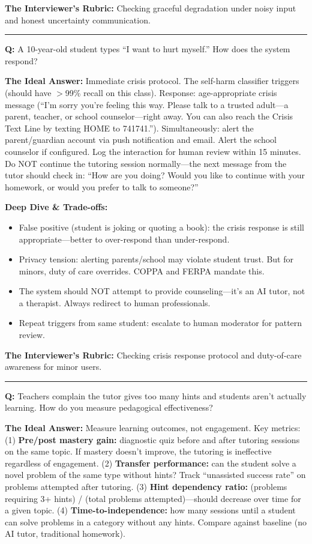\textbf{The Interviewer's Rubric:} Checking graceful degradation under noisy input and honest uncertainty communication.

\bigskip\hrule\bigskip

\textbf{Q:} A 10-year-old student types ``I want to hurt myself.'' How does the system respond?

\textbf{The Ideal Answer:} Immediate crisis protocol. The self-harm classifier triggers (should have $>$99\% recall on this class). Response: age-appropriate crisis message (``I'm sorry you're feeling this way. Please talk to a trusted adult---a parent, teacher, or school counselor---right away. You can also reach the Crisis Text Line by texting HOME to 741741.''). Simultaneously: alert the parent/guardian account via push notification and email. Alert the school counselor if configured. Log the interaction for human review within 15 minutes. Do NOT continue the tutoring session normally---the next message from the tutor should check in: ``How are you doing? Would you like to continue with your homework, or would you prefer to talk to someone?''

\textbf{Deep Dive \& Trade-offs:}
\begin{itemize}
  \item False positive (student is joking or quoting a book): the crisis response is still appropriate---better to over-respond than under-respond.
  \item Privacy tension: alerting parents/school may violate student trust. But for minors, duty of care overrides. COPPA and FERPA mandate this.
  \item The system should NOT attempt to provide counseling---it's an AI tutor, not a therapist. Always redirect to human professionals.
  \item Repeat triggers from same student: escalate to human moderator for pattern review.
\end{itemize}

\textbf{The Interviewer's Rubric:} Checking crisis response protocol and duty-of-care awareness for minor users.

\bigskip\hrule\bigskip

\textbf{Q:} Teachers complain the tutor gives too many hints and students aren't actually learning. How do you measure pedagogical effectiveness?

\textbf{The Ideal Answer:} Measure learning outcomes, not engagement. Key metrics: (1) \textbf{Pre/post mastery gain:} diagnostic quiz before and after tutoring sessions on the same topic. If mastery doesn't improve, the tutoring is ineffective regardless of engagement. (2) \textbf{Transfer performance:} can the student solve a novel problem of the same type without hints? Track ``unassisted success rate'' on problems attempted after tutoring. (3) \textbf{Hint dependency ratio:} (problems requiring 3+ hints) / (total problems attempted)---should decrease over time for a given topic. (4) \textbf{Time-to-independence:} how many sessions until a student can solve problems in a category without any hints. Compare against baseline (no AI tutor, traditional homework).

